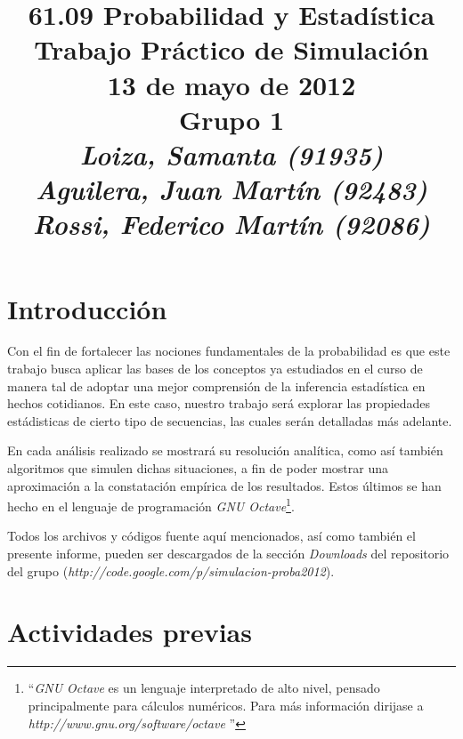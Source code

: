 \documentclass{article}
\begin{document}
\title{\huge 61.09 Probabilidad y Estadística \\ 
	  \Huge Trabajo Práctico de Simulación \\
	  \bigskip \Large 13 de mayo de 2012 \\
	  \bigskip \large \textbf{Grupo 1} \\
	  \large \textit{Loiza, Samanta (91935)\\Aguilera, Juan Martín (92483)\\Rossi, Federico Martín (92086)}}
\date{}
\maketitle



\section{Introducción}

	Con el fin de fortalecer las nociones fundamentales de la probabilidad es que este trabajo busca aplicar las bases de los conceptos ya estudiados en el curso de manera tal de adoptar una mejor comprensión de la inferencia estadística en hechos cotidianos. En este caso, nuestro trabajo será explorar las propiedades estádisticas de cierto tipo de secuencias, las cuales serán detalladas más adelante.
	\par 
	En cada análisis realizado se mostrará su resolución analítica, como así también algoritmos que simulen dichas situaciones, a fin de poder mostrar una aproximación a la constatación empírica de los resultados. Estos últimos se han hecho en el lenguaje de programación \textit{GNU Octave}\footnote{``\textit{GNU Octave} es un lenguaje interpretado de alto nivel, pensado principalmente para cálculos numéricos. Para más información dirijase a \textit{http://www.gnu.org/software/octave} ''}.
	\par 
	Todos los archivos y códigos fuente aquí mencionados, así como también el presente informe, pueden ser descargados de la sección \textit{Downloads} del repositorio del grupo (\textit{http://code.google.com/p/simulacion-proba2012}).



\section{Actividades previas}
\end{document}
